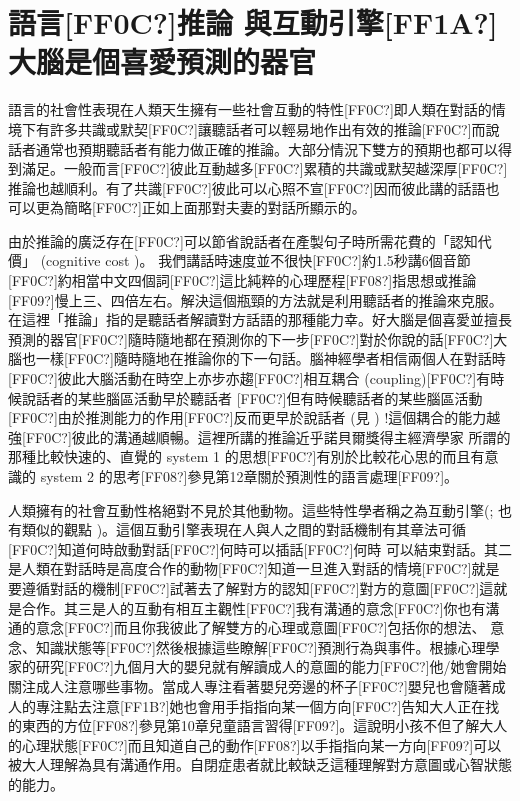 \section{語言[FF0C?]推論 與互動引擎[FF1A?]大腦是個喜愛預測的器官} %

語言的社會性表現在人類天生擁有一些社會互動的特性[FF0C?]即人類在對話的情境下有許多共識或默契[FF0C?]讓聽話者可以輕易地作出有效的推論[FF0C?]而說話者通常也預期聽話者有能力做正確的推論。大部分情況下雙方的預期也都可以得到滿足。一般而言[FF0C?]彼此互動越多[FF0C?]累積的共識或默契越深厚[FF0C?]推論也越順利。有了共識[FF0C?]彼此可以心照不宣[FF0C?]因而彼此講的話語也可以更為簡略[FF0C?]正如上面那對夫妻的對話所顯示的。

由於推論的廣泛存在[FF0C?]可以節省說話者在產製句子時所需花費的「認知代價」 (cognitive cost )。 我們講話時速度並不很快[FF0C?]約1.5秒講6個音節[FF0C?]約相當中文四個詞[FF0C?]這比純粹的心理歷程[FF08?]指思想或推論[FF09?]慢上三、四倍左右。解決這個瓶頸的方法就是利用聽話者的推論來克服。在這裡「推論」指的是聽話者解讀對方話語的那種能力幸。好大腦是個喜愛並擅長預測的器官[FF0C?]隨時隨地都在預測你的下一步[FF0C?]對於你說的話[FF0C?]大腦也一樣[FF0C?]隨時隨地在推論你的下一句話。腦神經學者相信兩個人在對話時[FF0C?]彼此大腦活動在時空上亦步亦趨[FF0C?]相互耦合 (coupling)[FF0C?]有時候說話者的某些腦區活動早於聽話者 [FF0C?]但有時候聽話者的某些腦區活動[FF0C?]由於推測能力的作用[FF0C?]反而更早於說話者 (見 \citealt{StephensEtAl2010}) !這個耦合的能力越強[FF0C?]彼此的溝通越順暢。這裡所講的推論近乎諾貝爾獎得主經濟學家\citet{Kahneman2011} 所謂的那種比較快速的、直覺的 system 1 的思想[FF0C?]有別於比較花心思的而且有意識的 system 2 的思考[FF08?]參見第12章關於預測性的語言處理[FF09?]。

人類擁有的社會互動性格絕對不見於其他動物。這些特性學者稱之為互動引擎(\citealt{EnfieldLevinson2006}; \citealt{Pagel2012} 也有類似的觀點 )。這個互動引擎表現在人與人之間的對話機制有其章法可循[FF0C?]知道何時啟動對話[FF0C?]何時可以插話[FF0C?]何時 可以結束對話。其二是人類在對話時是高度合作的動物[FF0C?]知道一旦進入對話的情境[FF0C?]就是要遵循對話的機制[FF0C?]試著去了解對方的認知[FF0C?]對方的意圖[FF0C?]這就是合作。其三是人的互動有相互主觀性[FF0C?]我有溝通的意念[FF0C?]你也有溝通的意念[FF0C?]而且你我彼此了解雙方的心理或意圖[FF0C?]包括你的想法、 意念、知識狀態等[FF0C?]然後根據這些瞭解[FF0C?]預測行為與事件。根據心理學家的研究[FF0C?]九個月大的嬰兒就有解讀成人的意圖的能力[FF0C?]他/她會開始關注成人注意哪些事物。當成人專注看著嬰兒旁邊的杯子[FF0C?]嬰兒也會隨著成人的專注點去注意[FF1B?]她也會用手指指向某一個方向[FF0C?]告知大人正在找的東西的方位[FF08?]參見第10章兒童語言習得[FF09?]。這說明小孩不但了解大人的心理狀態[FF0C?]而且知道自己的動作[FF08?]以手指指向某一方向[FF09?]可以被大人理解為具有溝通作用。自閉症患者就比較缺乏這種理解對方意圖或心智狀態的能力。

